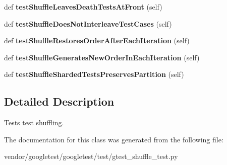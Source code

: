 \begin{DoxyCompactItemize}
def {\bfseries test\+Shuffle\+Leaves\+Death\+Tests\+At\+Front} (self)
\item 
\mbox{\label{classgtest__shuffle__test_1_1_g_test_shuffle_unit_test_a34bfc9696191f4c2782327e1e35ae902}} 
def {\bfseries test\+Shuffle\+Does\+Not\+Interleave\+Test\+Cases} (self)
\item 
\mbox{\label{classgtest__shuffle__test_1_1_g_test_shuffle_unit_test_a77b83a9870ad8d68524e1177f5320fb0}} 
def {\bfseries test\+Shuffle\+Restores\+Order\+After\+Each\+Iteration} (self)
\item 
\mbox{\label{classgtest__shuffle__test_1_1_g_test_shuffle_unit_test_ada78bae27e0d82d07bd663d53a36552b}} 
def {\bfseries test\+Shuffle\+Generates\+New\+Order\+In\+Each\+Iteration} (self)
\item 
\mbox{\label{classgtest__shuffle__test_1_1_g_test_shuffle_unit_test_abd33c5ef01ce6d1d025ebcc816d47c19}} 
def {\bfseries test\+Shuffle\+Sharded\+Tests\+Preserves\+Partition} (self)
\end{DoxyCompactItemize}


\subsection{Detailed Description}
\begin{DoxyVerb}Tests test shuffling.\end{DoxyVerb}
 

The documentation for this class was generated from the following file\+:\begin{DoxyCompactItemize}
\item 
vendor/googletest/googletest/test/gtest\+\_\+shuffle\+\_\+test.\+py\end{DoxyCompactItemize}
